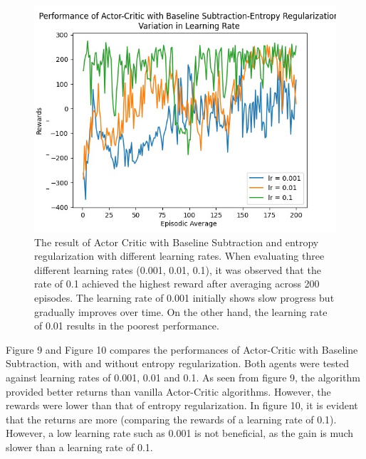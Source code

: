 \documentclass{article}
\begin{document}
\begin{figure}[h!]
\centering
\includegraphics[width=0.85\linewidth]{Report/images/13.Performance_of_Actor_Critc_BSubandER_LR.png}
\caption{\label{fig:ActorCritic with Baseline Subtraction and Entropy Regularization - Variation in Learning Rate}The result of Actor Critic with Baseline Subtraction and entropy regularization with different learning rates. 
When evaluating three different learning rates (0.001, 0.01, 0.1), it was observed that the rate of 0.1 achieved the highest reward after averaging across 200 episodes. The learning rate of 0.001 initially shows slow progress but gradually improves over time. On the other hand, the learning rate of 0.01 results in the poorest performance.}
\end{figure}
Figure 9 and Figure 10 compares the performances of Actor-Critic with Baseline Subtraction, with and without entropy regularization. Both agents were tested against learning rates of 0.001, 0.01 and 0.1. As seen from figure 9, the algorithm provided better returns than vanilla Actor-Critic algorithms. However, the rewards were lower than that of entropy regularization. In figure 10, it is evident that the returns are more (comparing the rewards of a learning rate of 0.1). However, a low learning rate such as 0.001 is not beneficial, as the gain is much slower than a learning rate of 0.1. 
\end{document}
